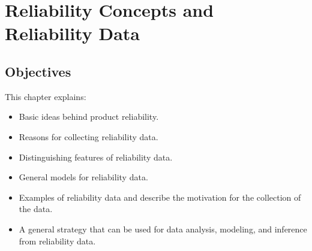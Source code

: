 \setcounter{chapter}{0}

\chapter{Reliability Concepts and Reliability Data}
\label{chapter:reliability.data}



 
 \section*{Objectives}
This chapter explains:
\begin{itemize} 
\item
Basic ideas behind product reliability.
\item 
Reasons for collecting reliability data.
\item 
Distinguishing features of reliability data.
\item 
General models for reliability data.
\item 
Examples of reliability data and describe the
motivation for the collection of the data.
\item 
A general strategy that can be used
for data analysis, modeling, and inference from reliability data.
\end{itemize}



